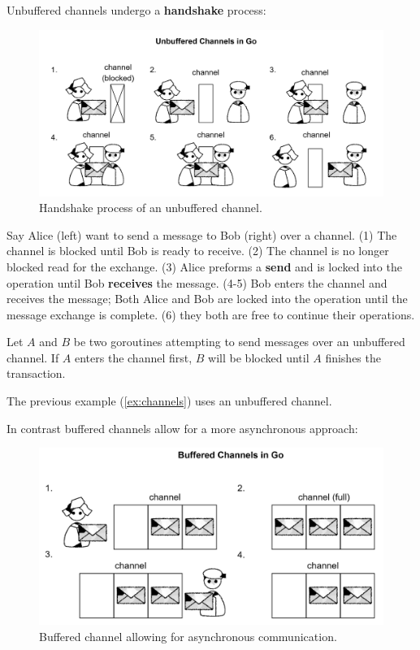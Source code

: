 \noindent
Unbuffered channels undergo a \textbf{handshake} process:
\begin{figure}[h]
    \centering
    \includegraphics[width=1\textwidth]{Sections/rpc/unbuffered.png}
    \caption{Handshake process of an unbuffered channel.}
    \label{fig:handshake}
\end{figure}

\noindent
Say Alice (left) want to send a message to Bob (right) over a channel. (1) The channel is blocked until Bob is ready to receive. (2) The channel is no longer blocked 
read for the exchange. (3) Alice preforms a \textbf{send} and is locked into the operation until Bob \textbf{receives} the message. (4-5) Bob enters the channel and receives the message;
Both Alice and Bob are locked into the operation until the message exchange is complete.
(6) they both are free to continue their operations.\\

\begin{theo}
\noindent
Let $A$ and $B$ be two goroutines attempting to send messages over an unbuffered channel. 
If $A$ enters the channel first, $B$ will be blocked until $A$ finishes the transaction.
\end{theo}
The previous example (\ref{ex:channels}) uses an unbuffered channel.
\newpage 

\noindent
In contrast buffered channels allow for a more asynchronous approach:

\begin{figure}[h]
    \centering
    \includegraphics[width=1\textwidth]{Sections/rpc/buffered.png}
    \caption{Buffered channel allowing for asynchronous communication.}
    \label{fig:buffered}
\end{figure}

